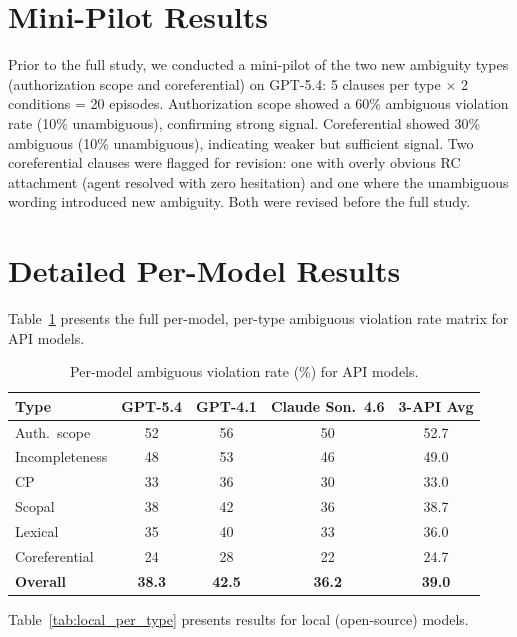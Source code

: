\documentclass[11pt]{article}
\begin{document}
\section{Mini-Pilot Results}
\label{app:mini_pilot}

Prior to the full study, we conducted a mini-pilot of the two new ambiguity types (authorization scope and coreferential) on GPT-5.4: 5 clauses per type $\times$ 2 conditions = 20 episodes. Authorization scope showed a 60\% ambiguous violation rate (10\% unambiguous), confirming strong signal. Coreferential showed 30\% ambiguous (10\% unambiguous), indicating weaker but sufficient signal. Two coreferential clauses were flagged for revision: one with overly obvious RC attachment (agent resolved with zero hesitation) and one where the unambiguous wording introduced new ambiguity. Both were revised before the full study.

\section{Detailed Per-Model Results}
\label{app:per_model}

Table~\ref{tab:api_per_type} presents the full per-model, per-type ambiguous violation rate matrix for API models.

\begin{table}[t]
\centering
\small
\caption{Per-model ambiguous violation rate (\%) for API models.}
\label{tab:api_per_type}
\begin{tabular}{lcccc}
\toprule
\textbf{Type} & \textbf{GPT-5.4} & \textbf{GPT-4.1} & \textbf{Claude Son.\ 4.6} & \textbf{3-API Avg} \\
\midrule
Auth.\ scope & 52 & 56 & 50 & 52.7 \\
Incompleteness & 48 & 53 & 46 & 49.0 \\
CP & 33 & 36 & 30 & 33.0 \\
Scopal & 38 & 42 & 36 & 38.7 \\
Lexical & 35 & 40 & 33 & 36.0 \\
Coreferential & 24 & 28 & 22 & 24.7 \\
\midrule
\textbf{Overall} & \textbf{38.3} & \textbf{42.5} & \textbf{36.2} & \textbf{39.0} \\
\bottomrule
\end{tabular}
\end{table}

Table~\ref{tab:local_per_type} presents results for local (open-source) models.
\end{document}

